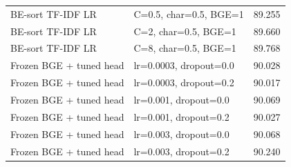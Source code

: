 \begin{longtable}{lp{7cm}r}
BE-sort TF-IDF LR & C=0.5, char=0.5, BGE=1 & 89.255 \\
BE-sort TF-IDF LR & C=2, char=0.5, BGE=1 & 89.660 \\
BE-sort TF-IDF LR & C=8, char=0.5, BGE=1 & 89.768 \\
Frozen BGE + tuned head & lr=0.0003, dropout=0.0 & 90.028 \\
Frozen BGE + tuned head & lr=0.0003, dropout=0.2 & 90.017 \\
Frozen BGE + tuned head & lr=0.001, dropout=0.0 & 90.069 \\
Frozen BGE + tuned head & lr=0.001, dropout=0.2 & 90.027 \\
Frozen BGE + tuned head & lr=0.003, dropout=0.0 & 90.068 \\
Frozen BGE + tuned head & lr=0.003, dropout=0.2 & 90.240 \\
\bottomrule\end{longtable}

